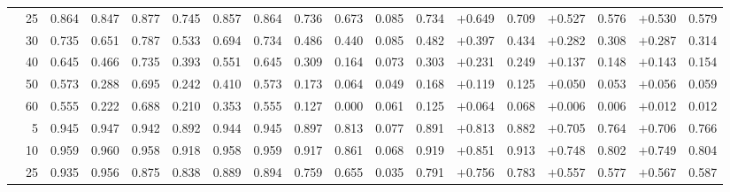 \documentclass[conference]{IEEEtran}
\theoremstyle{remark}
\begin{document}
\begin{table}[ht]
{\begin{tabular}{p{2.2cm}r rrrr rr rr rr rr rr rr}
  & 25 & 0.864 & 0.847 & 0.877 & 0.745 & 0.857 & 0.864 & 0.736 & 0.673 & 0.085 & 0.734 & $+$0.649 & 0.709 & $+$0.527 & 0.576 & $+$0.530 & 0.579 \\
  & 30 & 0.735 & 0.651 & 0.787 & 0.533 & 0.694 & 0.734 & 0.486 & 0.440 & 0.085 & 0.482 & $+$0.397 & 0.434 & $+$0.282 & 0.308 & $+$0.287 & 0.314 \\
  & 40 & 0.645 & 0.466 & 0.735 & 0.393 & 0.551 & 0.645 & 0.309 & 0.164 & 0.073 & 0.303 & $+$0.231 & 0.249 & $+$0.137 & 0.148 & $+$0.143 & 0.154 \\
  & 50 & 0.573 & 0.288 & 0.695 & 0.242 & 0.410 & 0.573 & 0.173 & 0.064 & 0.049 & 0.168 & $+$0.119 & 0.125 & $+$0.050 & 0.053 & $+$0.056 & 0.059 \\
  & 60 & 0.555 & 0.222 & 0.688 & 0.210 & 0.353 & 0.555 & 0.127 & 0.000 & 0.061 & 0.125 & $+$0.064 & 0.068 & $+$0.006 & 0.006 & $+$0.012 & 0.012 \\
\midrule
{}
  & 5  & 0.945 & 0.947 & 0.942 & 0.892 & 0.944 & 0.945 & 0.897 & 0.813 & 0.077 & 0.891 & $+$0.813 & 0.882 & $+$0.705 & 0.764 & $+$0.706 & 0.766 \\
  & 10 & 0.959 & 0.960 & 0.958 & 0.918 & 0.958 & 0.959 & 0.917 & 0.861 & 0.068 & 0.919 & $+$0.851 & 0.913 & $+$0.748 & 0.802 & $+$0.749 & 0.804 \\
  & 25 & 0.935 & 0.956 & 0.875 & 0.838 & 0.889 & 0.894 & 0.759 & 0.655 & 0.035 & 0.791 & $+$0.756 & 0.783 & $+$0.557 & 0.577 & $+$0.567 & 0.587 \\

\end{tabular}}
\end{table}
\end{document}
